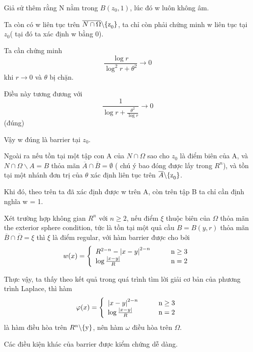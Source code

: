 Giả sử thêm rằng N nằm trong $B\left( z_0, 1 \right)$, lúc đó w luôn không âm.

Ta còn có w liên tục trên $\overline {N \cap \Omega } \backslash {\rm{\{ z}}_{\rm{0}} {\rm{\} }}$, ta chỉ còn phải chứng minh w liên tục tại $z_0$( tại đó ta xác định w bằng 0).

Ta cần chứng minh 
\[
\frac{{\log r}}{{\log ^2 r + \theta ^2 }} \to 0
\]
khi $r \to 0$ và $\theta$ bị chặn.

Điều này tương đương với \[
\frac{1}{{\log r + \frac{{\theta ^2 }}{{\log r}}}} \to 0
\]
(đúng)

Vậy w đúng là barrier tại $z_0$.

Ngoài ra nếu tồn tại một tập con A của $N \cap \Omega$ sao cho $z_0$ là điểm biên của A, và $N \cap \Omega \backslash A = B$ thỏa mãn $ \overline{A}\cap \overline{B} = \emptyset$ ( chú ý bao đóng được lấy trong $R^n$), và tồn tại một nhánh đơn trị của $\theta$ xác định liên tục trên $\overline {A} \backslash {\rm{\{ z}}_{\rm{0}} {\rm{\} }}$.

Khi đó, theo trên ta đã xác định được w trên A, còn trên tập B ta chỉ cần định nghĩa w = 1.

Xét trường hợp không gian $R^n$ với $n \ge 2$, nếu điểm $\xi$ thuộc biên của $\Omega$ thỏa mãn the exterior sphere condition, tức là tồn tại một quả cầu $B = B(y,r)$ thỏa mãn $ \overline{B} \cap \overline{\Omega} = \xi $ thì $\xi$ là điểm regular, với hàm barrier được cho bởi 
\begin{displaymath}
w(x) = \left\{ \begin{array}{ll}
 R^{2 - n}  - \left| {x - y} \right|^{2 - n} & {\rm{\qquad n}} \ge {\rm{3}} \\ 
 \log \frac{{\left| {x - y} \right|}}{R} & {\rm{\qquad n = 2}} \\ 
 \end{array} \right.
\end{displaymath}

Thực vậy, ta thấy theo kết quả trong quá trình tìm lời giải cơ bản của phương trình Laplace, thì hàm \begin{displaymath}
\varphi (x) = \left\{ \begin{array}{ll}
 \left| {x - y} \right|^{2 - n} & {\rm{\qquad n}} \ge {\rm{3}} \\ 
 \log \frac{{\left| {x - y} \right|}}{R} &{\rm{\qquad n = 2}} \\ 
 \end{array} \right.
\end{displaymath}
là hàm điều hòa trên $R^n \backslash {\rm{\{ y\} }}$, nên hàm $\omega$ điều hòa trên $\Omega$.

Các điều kiện khác của barrier được kiểm chứng dễ dàng.
